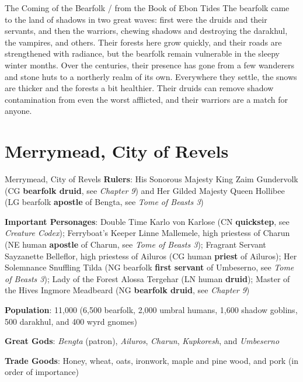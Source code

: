 \documentclass[10pt,a4paper,twoside,bg=print,twocolumn,openany,nodeprecatedcode]{dndbook}
\begin{document}
\begin{DndSidebar}[float=!b]{The Coming of the Bearfolk / from the Book of Ebon Tides}
The bearfolk came to the land of shadows in two great waves: first were the druids and their servants, and then the warriors, chewing shadows and destroying the darakhul, the vampires, and others. Their forests here grow quickly, and their roads are strengthened with radiance, but the bearfolk remain vulnerable in the sleepy winter months. Over the centuries, their presence has gone from a few wanderers and stone huts to a northerly realm of its own. Everywhere they settle, the snows are thicker and the forests a bit healthier. Their druids can remove shadow contamination from even the worst afflicted, and their warriors are a match for anyone.



\end{DndSidebar}

\section{Merrymead, City of Revels}
\begin{DndSidebar}[float=!b]{Merrymead, City of Revels}
\textbf{Rulers}: His Sonorous Majesty King Zaim Gundervolk (CG \textbf{bearfolk druid}, see \textit{Chapter 9}) and Her Gilded Majesty Queen Hollibee (LG bearfolk \textbf{apostle} of Bengta, see \textit{Tome of Beasts 3})



\textbf{Important Personages}: Double Time Karlo von Karlose (CN \textbf{quickstep}, see \textit{Creature Codex}); Ferryboat's Keeper Linne Mallemele, high priestess of Charun (NE human \textbf{apostle} of Charun, see \textit{Tome of Beasts 3}); Fragrant Servant Sayzanette Belleflor, high priestess of Ailuros (CG human \textbf{priest} of Ailuros); Her Solemnance Snuffling Tilda (NG bearfolk \textbf{first servant} of Umbeserno, see \textit{Tome of Beasts 3}); Lady of the Forest Alossa Tergehar (LN human \textbf{druid}); Master of the Hives Ingmore Meadbeard (NG \textbf{bearfolk druid}, see \textit{Chapter 9})



\textbf{Population}: 11,000 (6,500 bearfolk, 2,000 umbral humans, 1,600 shadow goblins, 500 darakhul, and 400 wyrd gnomes)



\textbf{Great Gods}: \textit{Bengta} (patron), \textit{Ailuros}, \textit{Charun}, \textit{Kupkoresh}, and \textit{Umbeserno}



\textbf{Trade Goods}: Honey, wheat, oats, ironwork, maple and pine wood, and pork (in order of importance)





\end{DndSidebar}
\end{document}
